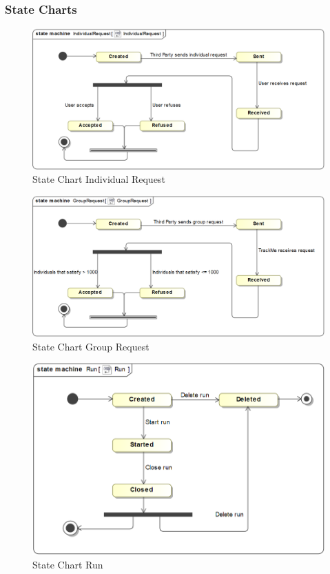 \documentclass[a4paper]{article}
\begin{document}
    \subsubsection{State Charts}
    \begin{figure}[!ht]
        \centering
        \includegraphics[width=\textwidth, keepaspectratio]{images/UML/state_individualRequest.png}
        \caption{State Chart Individual Request}
        \label{fig:state_individual}
    \end{figure}
    \begin{figure}[!ht]
        \centering
        \includegraphics[width=\textwidth, keepaspectratio]{images/UML/state_groupRequest.png}
        \caption{State Chart Group Request}
        \label{fig:state_group}
    \end{figure}
    \begin{figure}[!ht]
        \centering
        \includegraphics[width=\textwidth, keepaspectratio]{images/UML/state_run.png}
        \caption{State Chart Run}
        \label{fig:state_run}
    \end{figure}
    \newpage
\end{document}
